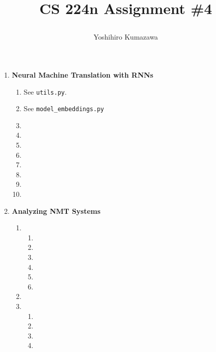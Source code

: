 \documentclass[12pt]{article}
\title{
  \vspace{-2cm}
  CS 224n Assignment \#4 \\
  \author{Yoshihiro Kumazawa}
}
\begin{document}
\maketitle
\begin{enumerate}[label=\textbf{\arabic*.}]
  \item \textbf{Neural Machine Translation with RNNs}
  \begin{enumerate}[label=(\alph*)]
    \item See \texttt{utils.py}.
    \item See \texttt{model\_embeddings.py}
    \item
    \item
    \item
    \item
    \item
    \item
    \item
    \item
  \end{enumerate}
  \item \textbf{Analyzing NMT Systems}
  \begin{enumerate}[label=(\alph*)]
    \item
    \begin{enumerate}[label=\roman*.]
      \item
      \item
      \item
      \item
      \item
      \item
    \end{enumerate}
    \item
    \item
    \begin{enumerate}[label=\roman*.]
      \item
      \item
      \item
      \item
    \end{enumerate}
  \end{enumerate}
\end{enumerate}
\end{document}
